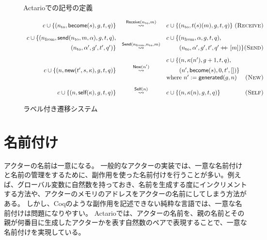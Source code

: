 \begin{figure}
  
  \label{code:formalization:config}
  \caption{Actarioでの記号の定義}
\end{figure}

\begin{figure}[t]\centering
  \begin{displaymath}
    \begin{array}{rcl}
      c \cup \{(n_{\textrm{to}}, \textsf{become}(s), g, t, q)\} &
      \overset{\textsf{Receive}(n_{\textrm{to}}, m)}{\leadsto} &
      c \cup \{(n_{\textrm{to}}, t(s)(m), g, t, q)\}
      \hfill \textsc{(Receive)} \\[2ex]

      c \cup \{(n_{\textrm{from}}, \textsf{send}(n_{\textrm{to}}, m, \alpha), g, t, q),
      & &
      c \cup \{(n_{\textrm{from}}, \alpha, g, t, q), \\
      (n_{\textrm{to}}, \alpha', g', t', q')\} &
      \overset{\textsf{Send}(n_{\textrm{from}}, n_{\textrm{to}}, m)}{\leadsto} &
      \hspace{5ex} (n_{\textrm{to}}, \alpha', g', t', q' \doubleplus [m])\}
      \hfill \textsc{(Send)} \\[2ex]

      & & c \cup \{(n, \kappa(n'), g + 1, t, q), \\
      c \cup \{(n, \textsf{new}(t', s, \kappa), g, t, q)\} &
      \overset{\textsf{New}(n')}{\leadsto} &
      \hspace{5ex} (n', \textsf{become}(s), 0, t', [])\} \\
      & & \textrm{where}\ n' := \textsf{generated}(g, n)
      \hfill \textsc{(New)} \\[2ex]

      c \cup \{(n, \textsf{self}(\kappa), g, t, q)\} &
      \overset{\textsf{Self}(n)}{\leadsto} &
      c \cup \{(n, \kappa(n), g, t, q)\}
      \hfill \textsc{(Self)}
    \end{array}
  \end{displaymath}
  \caption{ラベル付き遷移システム}\label{expr:formalization:semantics}
\end{figure}

\section{名前付け}

アクターの名前は一意になる。
一般的なアクターの実装では、一意な名前付けと名前の管理をするために、副作用を使った名前付けを行うことが多い。例えば、グローバル変数に自然数を持っておき、名前を生成する度にインクリメントする方法や、アクターのメモリのアドレスをアクターの名前にしてしまう方法がある。
しかし、Coqのような副作用を記述できない純粋な言語では、一意な名前付けは問題になりやすい。
Actarioでは、アクターの名前を、親の名前とその親が何番目に生成したアクターかを表す自然数のペアで表現することで、一意な名前付けを実現している。

